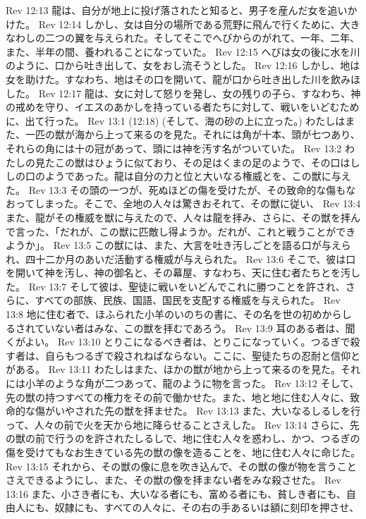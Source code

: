 Rev 12:13  龍は、自分が地上に投げ落されたと知ると、男子を産んだ女を追いかけた。
Rev 12:14  しかし、女は自分の場所である荒野に飛んで行くために、大きなわしの二つの翼を与えられた。そしてそこでへびからのがれて、一年、二年、また、半年の間、養われることになっていた。
Rev 12:15  へびは女の後に水を川のように、口から吐き出して、女をおし流そうとした。
Rev 12:16  しかし、地は女を助けた。すなわち、地はその口を開いて、龍が口から吐き出した川を飲みほした。
Rev 12:17  龍は、女に対して怒りを発し、女の残りの子ら、すなわち、神の戒めを守り、イエスのあかしを持っている者たちに対して、戦いをいどむために、出て行った。
Rev 13:1  (12:18) (そして、海の砂の上に立った。) わたしはまた、一匹の獣が海から上って来るのを見た。それには角が十本、頭が七つあり、それらの角には十の冠があって、頭には神を汚す名がついていた。
Rev 13:2  わたしの見たこの獣はひょうに似ており、その足はくまの足のようで、その口はししの口のようであった。龍は自分の力と位と大いなる権威とを、この獣に与えた。
Rev 13:3  その頭の一つが、死ぬほどの傷を受けたが、その致命的な傷もなおってしまった。そこで、全地の人々は驚きおそれて、その獣に従い、
Rev 13:4  また、龍がその権威を獣に与えたので、人々は龍を拝み、さらに、その獣を拝んで言った、「だれが、この獣に匹敵し得ようか。だれが、これと戦うことができようか」。
Rev 13:5  この獣には、また、大言を吐き汚しごとを語る口が与えられ、四十二か月のあいだ活動する権威が与えられた。
Rev 13:6  そこで、彼は口を開いて神を汚し、神の御名と、その幕屋、すなわち、天に住む者たちとを汚した。
Rev 13:7  そして彼は、聖徒に戦いをいどんでこれに勝つことを許され、さらに、すべての部族、民族、国語、国民を支配する権威を与えられた。
Rev 13:8  地に住む者で、ほふられた小羊のいのちの書に、その名を世の初めからしるされていない者はみな、この獣を拝むであろう。
Rev 13:9  耳のある者は、聞くがよい。
Rev 13:10  とりこになるべき者は、とりこになっていく。つるぎで殺す者は、自らもつるぎで殺されねばならない。ここに、聖徒たちの忍耐と信仰とがある。
Rev 13:11  わたしはまた、ほかの獣が地から上って来るのを見た。それには小羊のような角が二つあって、龍のように物を言った。
Rev 13:12  そして、先の獣の持つすべての権力をその前で働かせた。また、地と地に住む人々に、致命的な傷がいやされた先の獣を拝ませた。
Rev 13:13  また、大いなるしるしを行って、人々の前で火を天から地に降らせることさえした。
Rev 13:14  さらに、先の獣の前で行うのを許されたしるしで、地に住む人々を惑わし、かつ、つるぎの傷を受けてもなお生きている先の獣の像を造ることを、地に住む人々に命じた。
Rev 13:15  それから、その獣の像に息を吹き込んで、その獣の像が物を言うことさえできるようにし、また、その獣の像を拝まない者をみな殺させた。
Rev 13:16  また、小さき者にも、大いなる者にも、富める者にも、貧しき者にも、自由人にも、奴隷にも、すべての人々に、その右の手あるいは額に刻印を押させ、
